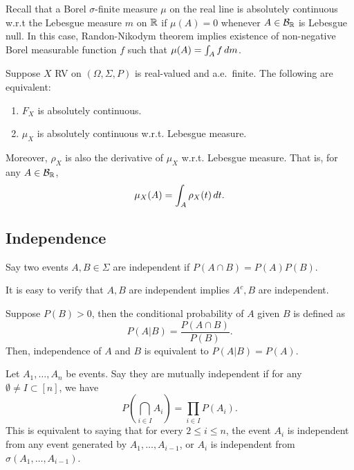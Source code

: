 \documentclass[a4paper]{article}
\begin{document}
\begin{remark}
  Recall that a Borel $\sigma$-finite measure $\mu$ on the real line
  is absolutely continuous w.r.t the Lebesgue measure $m$ on $\mathbb{R}$ if
  $\mu (A) = 0$ whenever $A \in \mathcal{B}_{\mathbb{R}}$ is Lebesgue null.
  In this case, Randon-Nikodym theorem implies existence of non-negative
  Borel measurable function $f$ such that $\mu (A) = \int_A f \, d m$.
\end{remark}

\begin{thm}
  Suppose $X$ RV on $(\Omega, \Sigma, P)$ is real-valued and a.e.\ finite.
  The following are equivalent:
  \begin{enumerate}
    \item $F_X$ is absolutely continuous.
    \item $\mu_X$ is absolutely continuous w.r.t. Lebesgue measure.
  \end{enumerate}
  Moreover, $\rho_X$ is also the derivative of $\mu_X$ w.r.t. Lebesgue
  measure. That is, for any $A \in \mathcal{B}_{\mathbb{R}}$,
  \[
  \mu_X (A) = \int_A \rho_X (t) \, d t.
  \]
\end{thm}

\subsection{Independence}

\begin{defi}
  Say two events $A, B \in \Sigma$ are independent if
  $P (A \cap B) = P (A) P (B)$.
\end{defi}

It is easy to verify that $A, B$ are independent implies
$A^c, B$ are independent.

\begin{remark}
  Suppose $P (B) > 0$, then the conditional probability of $A$
  given $B$ is defined as
  \[
  P (A | B) = \frac{P (A \cap B)}{P (B)}.
  \]
  Then, independence of $A$ and $B$ is equivalent to
  $P (A | B) = P (A)$.
\end{remark}

\begin{defi}
  Let $A_1, \dots, A_n$ be events. Say they are mutually independent
  if for any $\emptyset \neq I \subset [n]$, we have
  \[
  P \left( \bigcap_{i \in I} A_i \right) = \prod_{i \in I} P (A_i).
  \]
  This is equivalent to saying that for every $2 \leq i \leq n$,
  the event $A_i$ is independent from any event generated by
  $A_1, \dots, A_{i - 1}$, or $A_i$ is independent from
  $\sigma \left( A_1, \dots, A_{i - 1} \right)$.
\end{defi}
\end{document}
